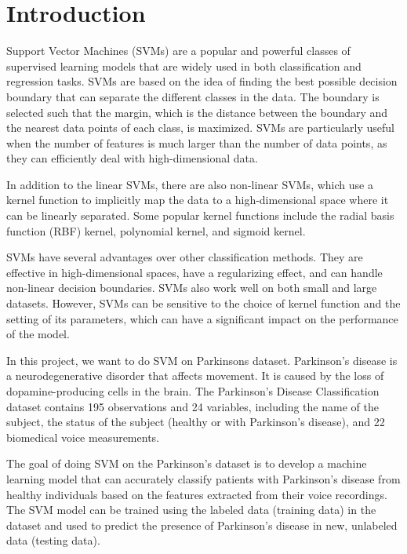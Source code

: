\section{Introduction}

Support Vector Machines (SVMs) are a popular and powerful classes of supervised learning models that are widely used in both classification and regression tasks. SVMs are based on the idea of finding the best possible decision boundary that can separate the different classes in the data. The boundary is selected such that the margin, which is the distance between the boundary and the nearest data points of each class, is maximized. 
SVMs are particularly useful when the number of features is much larger than the number of data points, as they can efficiently deal with high-dimensional data. 

In addition to the linear SVMs, there are also non-linear SVMs, which use a kernel function to implicitly map the data to a high-dimensional space where it can be linearly separated. Some popular kernel functions include the radial basis function (RBF) kernel, polynomial kernel, and sigmoid kernel.

SVMs have several advantages over other classification methods. They are effective in high-dimensional spaces, have a regularizing effect, and can handle non-linear decision boundaries. SVMs also work well on both small and large datasets. However, SVMs can be sensitive to the choice of kernel function and the setting of its parameters, which can have a significant impact on the performance of the model.

In this project, we want to do SVM on Parkinsons dataset. Parkinson's disease is a neurodegenerative disorder that affects movement. It is caused by the loss of dopamine-producing cells in the brain. The Parkinson's Disease Classification dataset contains 195 observations and 24 variables, including the name of the subject, the status of the subject (healthy or with Parkinson's disease), and 22 biomedical voice measurements. 

The goal of doing SVM on the Parkinson's dataset is to develop a machine learning model that can accurately classify patients with Parkinson's disease from healthy individuals based on the features extracted from their voice recordings. The SVM model can be trained using the labeled data (training data) in the dataset and used to predict the presence of Parkinson's disease in new, unlabeled data (testing data).

